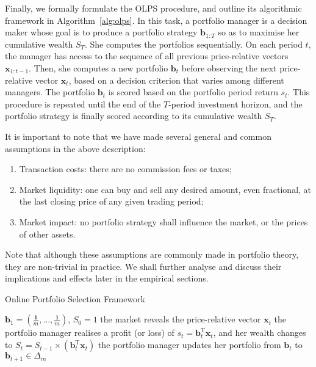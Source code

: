 Finally, we formally formulate the OLPS procedure, and outline its algorithmic framework in Algorithm~\ref{alg:olps}. In this task, a portfolio manager is a decision maker whose goal is to produce a portfolio strategy $\mathbf{b}_{1:T}$ so as to maximise her cumulative wealth $S_T$. She computes the portfolios sequentially. On each period $t$, the manager has access to the sequence of all previous price-relative vectors $\mathbf{x}_{1:t-1}$. Then, she computes a new portfolio $\mathbf{b}_t$ before observing the next price-relative vector $\mathbf{x}_t$, based on a decision criterion that varies among different managers. The portfolio $\mathbf{b}_t$ is scored based on the portfolio period return $s_t$. This procedure is repeated until the end of the $T$-period investment horizon, and the portfolio strategy is finally scored according to its cumulative wealth $S_T$.

It is important to note that we have made several general and common assumptions in the above description:
\begin{enumerate}
  \item Transaction costs: there are no commission fees or taxes;
  \item Market liquidity: one can buy and sell any desired amount, even fractional, at the last closing price of any given trading period;
  \item Market impact: no portfolio strategy shall influence the market, or the prices of other assets.
\end{enumerate}
Note that although these assumptions are commonly made in portfolio theory, they are non-trivial in practice. We shall further analyse and discuss their implications and effects later in the empirical sections.
\begin{algorithm}
  \caption{Online Portfolio Selection Framework}
\label{alg:olps}
  \begin{algorithmic}[1]
     $\mathbf{b}_1 = \left(\frac{\mathbf{1}}{m}, \ldots, \frac{\mathbf{1}}{m}\right)$, $S_0 = 1$
      \STATE the market reveals the price-relative vector $\mathbf{x}_t$
      \STATE the portfolio manager realises a profit (or loss) of $s_t = \mathbf{b}_t^\text{T}\mathbf{x}_t$, and her wealth changes to $S_t = S_{t-1} \times (\mathbf{b}_t^\text{T}\mathbf{x}_t)$
      \STATE the portfolio manager updates her portfolio from $\mathbf{b}_t$ to $\mathbf{b}_{t+1} \in \Delta_m$
    \ENDIF
    \ENDFOR
  \end{algorithmic}
\end{algorithm}

